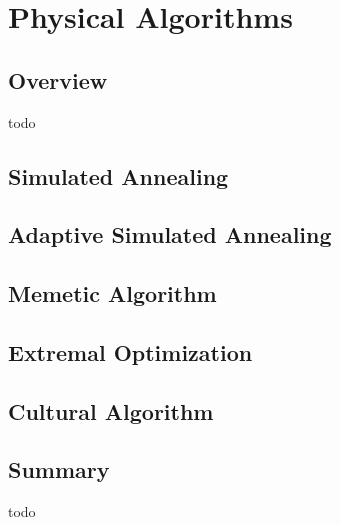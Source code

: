 


\chapter{Physical Algorithms}
\label{ch:physical}

\section{Overview}
todo


\newpage\section{Simulated Annealing}
\newpage\section{Adaptive Simulated Annealing}
\newpage\section{Memetic Algorithm}
\newpage\section{Extremal Optimization}
\newpage\section{Cultural Algorithm}
\newpage

\section{Summary}
todo
